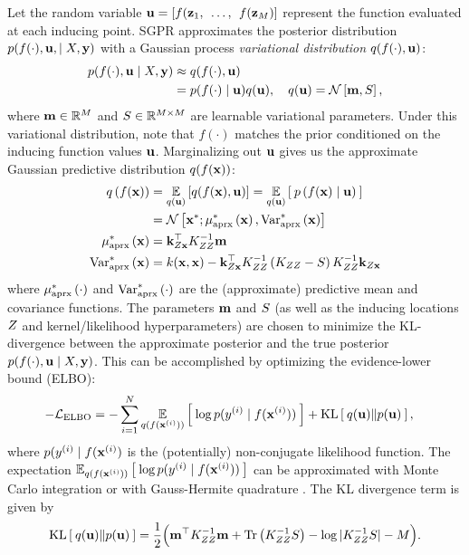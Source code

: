 Let the random variable $\mathbf{u} = [f(\mathbf{z}_1, \:\: \ldots, \:\: f(\mathbf{z}_M)]$ represent the function evaluated at each inducing point.
SGPR approximates the posterior distribution $p( f(\cdot), \mathbf{u}, \mid X, \mathbf{y})$ with a Gaussian process \emph{variational distribution} $q(f(\cdot), \mathbf{u})$:
%
\begin{align*}
  p(f(\cdot), \bu \mid \bX, \by) &\approx q(f(\cdot), \bu)
  \\
  &= p(f(\cdot) \mid \bu) q(\bu),
  \quad
  q(\bu) = \normaldist{\bm}{\bS},
\end{align*}
%
where $\mathbf{m} \in \mathbb{R}^M$ and $S \in \mathbb{R}^{M \times M}$ are learnable variational parameters.
Under this variational distribution, note that $f(\cdot)$ matches the prior conditioned on the inducing function values $\mathbf{u}$.
Marginalizing out $\mathbf{u}$ gives us the approximate Gaussian predictive distribution $q( f(\mathbf{x}) )$:
%
\begin{align}
  q \left( f(\bx) \right) &= \Evover{q(\bu)}{ q( f(\bx), \bu) }
  = \Evover{q(\bu)}{ \: p\left( f(\bx) \mid \bu \right) \: }
  \nonumber \\
  &= \normaldist{ \bxtest; \ameantest{ \bx }} { \avartest{ \bx }}
  \nonumber
  \\
  \ameantest{\bx} &= \bk_{\bZ\bx}^\top \bK_{\bZ\bZ}^{-1} \bm
  \label{eqn:approx_pred_mean} \\
  \avartest{\bx} &= k(\bx, \bx) -
    \bk_{\bZ\bx}^\top \bK_{\bZ\bZ}^{-1} \left( \bK_{\bZ\bZ} - \bS \right) \bK_{\bZ\bZ}^{-1} \bk_{\bZ\bx}
  \label{eqn:approx_pred_covar}
\end{align}
%
where $\mu^*_\text{aprx} \left( \cdot \right)$ and $\text{Var}^*_\text{aprx} \left( \cdot \right)$ are the (approximate) predictive mean and covariance functions.
The parameters $\mathbf{m}$ and $S$ (as well as the inducing locations $Z$ and kernel/likelihood hyperparameters) are chosen to minimize the KL-divergence between the approximate posterior and the true posterior $p(f(\cdot), \mathbf{u} \mid X, \mathbf{y})$.
This can be accomplished by optimizing the evidence-lower bound (ELBO):
%
\begin{align}
	-\mathcal L_\text{ELBO} &= -\sum_{i=1}^N \operatorname*{\mathbb{E}}_{q(f(\mathbf{x}^{(i)}))} \left[   \: \log p( y^{(i)} \mid f(\mathbf{x}^{(i)}) ) \:  \right] + \operatorname*{KL} \left[ \:  q(\mathbf{u})  \Vert  p(\mathbf{u})  \: \right],
	\label{eqn:elbo}
\end{align}
%
where $p(y^{(i)} \mid f(\mathbf{x}^{(i)})$ is the (potentially) non-conjugate likelihood function.
The expectation $\operatorname*{\mathbb{E}}_{q(f(\mathbf{x}^{(i)}))} \left[   \: \log p( y^{(i)} \mid f(\mathbf{x}^{(i)}) ) \:  \right]$ can be approximated with Monte Carlo integration \citep{wilson2016stochastic} or with Gauss-Hermite quadrature \cite{hensman2015scalable}.
The KL divergence term is given by
%
\[
	\kl{ q(\bu) }{ p(\bu) } = \frac{1}{2} \Bigl( \bm^\top \bK_{\bZ\bZ}^{-1} \bm + \tr{ \bK_{\bZ\bZ}^{-1} \bS } - \log \vert \bK_{\bZ\bZ}^{-1} \bS \vert - M \Bigr).
\]

